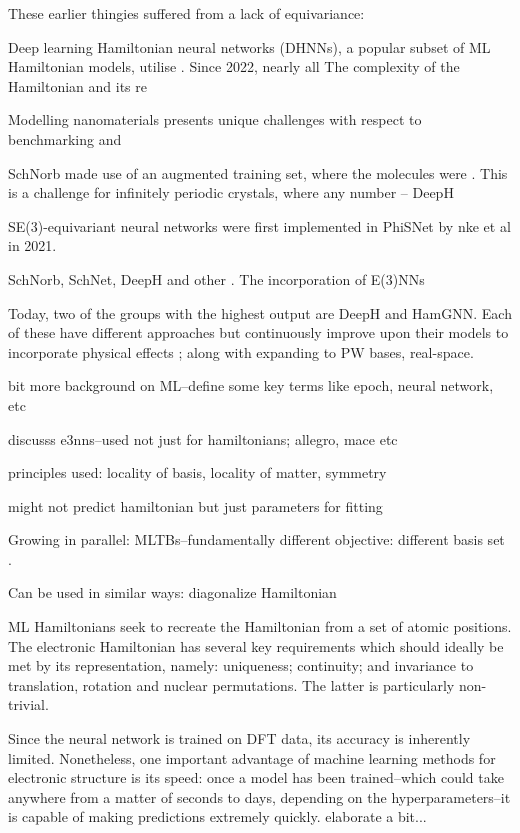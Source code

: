 \documentclass[11pt,a4paper,twoside]{report}  %
\numberwithin{equation}{section}					%
\numberwithin{figure}{section}						%
\newcommand{\red}[1]{{\color{red}#1}}
\begin{document}
These earlier thingies suffered from a lack of equivariance: 

Deep learning Hamiltonian neural networks (DHNNs), a popular subset of ML Hamiltonian models, utilise . Since 2022, nearly all  The complexity of the Hamiltonian and its re

Modelling nanomaterials presents unique challenges with respect to benchmarking and 

SchNorb made use of an augmented training set, where the molecules were . This is a challenge for infinitely periodic crystals, where any number -- DeepH

SE(3)-equivariant neural networks were first implemented in PhiSNet by nke et al in 2021. 

SchNorb, SchNet, DeepH and other . The incorporation of E(3)NNs 

Today, two of the groups with the highest output are DeepH and HamGNN. Each of these have different approaches but continuously improve upon their models to incorporate physical effects ; along with expanding to PW bases, real-space. 
 

\red{bit more background on ML--define some key terms like epoch, neural network, etc}


\red{discusss e3nns--used not just for hamiltonians; allegro, mace etc}

\red{principles used: locality of basis, locality of matter, symmetry}


might not predict hamiltonian but just parameters for fitting


Growing in parallel: MLTBs--fundamentally different objective: different basis set . 

Can be used in similar ways: diagonalize Hamiltonian

ML Hamiltonians seek to recreate the Hamiltonian from a set of atomic positions. The electronic Hamiltonian has several key requirements which should ideally be met by its representation, namely: uniqueness; continuity; and invariance to translation, rotation and nuclear permutations\autocite{ruppMachineLearningQuantum2015}. The latter is particularly non-trivial.

Since the neural network is trained on DFT data, its accuracy is inherently limited. Nonetheless, one important advantage of machine learning methods for electronic structure is its speed: once a model has been trained--which could take anywhere from a matter of seconds to days, depending on the hyperparameters--it is capable of making predictions extremely quickly. \red{elaborate a bit...} 
\end{document}
